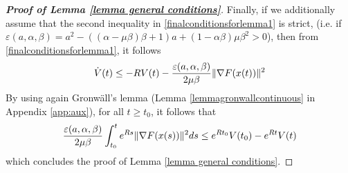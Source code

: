 \documentclass[reqno]{amsart}
\theoremstyle{plain}
\theoremstyle{definition}
\theoremstyle{remark}
\DeclarePairedDelimiter{\norm}{\lVert}{\rVert}	%
\begin{document}
\begin{proof}[\textbf{Proof of Lemma \ref{lemma general conditions}}]
	Finally, if we additionally assume that the second inequality in \eqref{finalconditionsforlemma1} is strict, (i.e. if $\varepsilon(a,\alpha,\beta)=a^2 - \left((\alpha-\mu\beta)\beta +1\right)a + (1-\alpha\beta)\mu\beta^{2}>0$), then from \eqref{finalconditionsforlemma1}, it follows
	\begin{equation}
		\dot{V}(t) \leq -R V(t) -\frac{\varepsilon(a,\alpha,\beta)}{2\mu\beta}\norm{\nabla F(x(t))}^{2}
	\end{equation}
	By using again Gronw\"all's lemma  (Lemma \ref{lemmagronwallcontinuous} in Appendix \ref{app:aux}), for all $t\geq t_{0}$, it follows that
	\begin{equation}
		\frac{\varepsilon(a,\alpha,\beta)}{2\mu\beta}\int_{t_{0}}^{t}e^{Rs}\norm{\nabla F(x(s))}^{2}ds \leq e^{Rt_{0}}V(t_{0})-e^{Rt}V(t)
	\end{equation}
	which concludes the proof of Lemma \ref{lemma general conditions}.
\end{proof}
\end{document}
